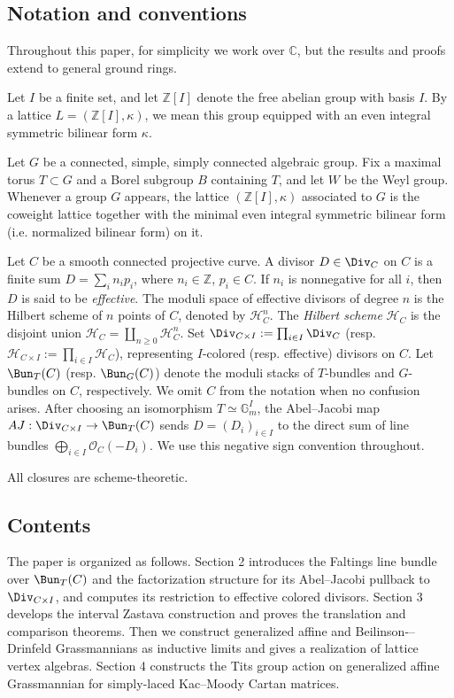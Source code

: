 \documentclass{amsart}
\numberwithin{equation}{section}
\numberwithin{figure}{section}
\theoremstyle{definition}
\theoremstyle{remark}
\renewcommand{\c}[1]{\mathcal{#1}}
\renewcommand{\b}[1]{\mathbb{#1}}
\begin{document}
\subsection{Notation and conventions}
Throughout this paper, for simplicity we work over $\b C$, but the results and proofs extend to general ground rings. 

Let \(I\) be a finite set, and let \(\mathbb Z[I]\) denote the free abelian group with basis \(I\). By a lattice \(L=(\mathbb Z[I],\kappa)\), we mean this group equipped with an even integral symmetric bilinear form \(\kappa\).

Let \(G\) be a connected, simple, simply connected algebraic group. Fix a maximal torus \(T\subset G\) and a Borel subgroup \(B\) containing \(T\), and let \(W\) be the Weyl group. Whenever a group $G$ appears, the lattice $(\b Z[I],\kappa)$ associated to $G$ is the coweight lattice together with the minimal even integral symmetric bilinear form (i.e. normalized bilinear form) on it.

Let $C$ be a smooth connected projective curve. A divisor $D\in\Div_C$ on $C$ is a finite sum $D=\sum_i n_ip_i$, where $n_i\in \b Z$, $p_i\in C$. If $n_i$ is nonnegative for all $i$, then $D$ is said to be \textit{effective}. The moduli space of effective divisors of degree $n$ is the Hilbert scheme of $n$ points of $C$, denoted by $\c H_C^n$. The \textit{Hilbert scheme} $\c H_C$ is the disjoint union $\c H_C=\coprod_{n\ge0} \c H_C^n$. Set $\Div_{C\times I}:=\prod_{i\in I}\Div_C$ (resp. $\c H_{C\times I}:=\prod_{i\in I}\c H_C$), representing $I$-colored (resp. effective) divisors on $C$. Let $\Bun_T(C)$ (resp. {$\Bun_G(C)$}) denote the moduli stacks of \(T\)-bundles and \(G\)-bundles on \(C\), respectively. We omit \(C\) from the notation when no confusion  arises. After choosing an isomorphism $T\simeq \b G_m^I$, the Abel--Jacobi map $AJ: \Div_{C\times I}\to\Bun_T(C)$ sends $D=(D_i)_{i\in I}$ to the direct sum of line bundles $\bigoplus_{i\in I}\c O_C(-D_i)$. We use this negative sign convention throughout.

All closures are scheme-theoretic.
\subsection{Contents}
The paper is organized as follows. Section 2 introduces the Faltings line bundle over $\Bun_T(C)$ and the factorization structure for its Abel--Jacobi pullback to $\Div_{C\times I}$, and computes its restriction to effective colored divisors. Section 3 develops the interval Zastava construction and proves the translation and comparison theorems. Then we  construct generalized affine and Beilinson-–Drinfeld Grassmannians as inductive limits and gives a realization of lattice vertex algebras. Section 4 constructs the Tits group action on generalized affine Grassmannian for simply-laced Kac--Moody Cartan matrices.
\end{document}
